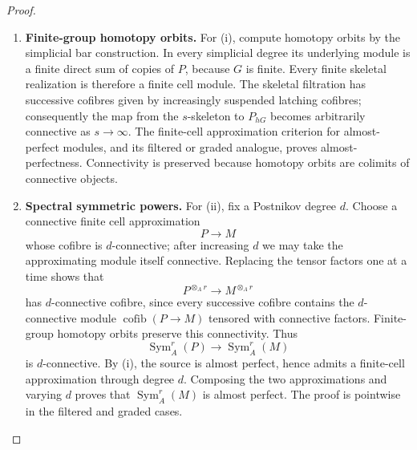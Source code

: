 \begin{proof}
\leavevmode
\begin{enumerate}[label=\textup{(\arabic*)}]
    \item \textbf{Finite-group homotopy orbits.}
    For \textup{(i)}, compute homotopy orbits by the simplicial bar construction.
    In every simplicial degree its underlying module is a finite direct sum of
    copies of \(P\), because \(G\) is finite. Every finite skeletal realization
    is therefore a finite cell module. The skeletal filtration has successive
    cofibres given by increasingly suspended latching cofibres; consequently the
    map from the \(s\)-skeleton to \(P_{hG}\) becomes arbitrarily connective as
    \(s\to\infty\). The finite-cell approximation criterion for almost-perfect
    modules, and its filtered or graded analogue, proves almost-perfectness.
    Connectivity is preserved because homotopy orbits are colimits of connective
    objects.
    \item \textbf{Spectral symmetric powers.}
    For \textup{(ii)}, fix a Postnikov degree \(d\). Choose a connective finite
    cell approximation
    \[
        P\longrightarrow M
    \]
    whose cofibre is \(d\)-connective; after increasing \(d\) we may take the
    approximating module itself connective. Replacing the tensor factors one at a
    time shows that
    \[
        P^{\otimes_A r}\longrightarrow M^{\otimes_A r}
    \]
    has \(d\)-connective cofibre, since every successive cofibre contains the
    \(d\)-connective module \(\operatorname{cofib}(P\to M)\) tensored with
    connective factors. Finite-group homotopy orbits preserve this connectivity.
    Thus
    \[
        \operatorname{Sym}^r_A(P)
        \longrightarrow
        \operatorname{Sym}^r_A(M)
    \]
    is \(d\)-connective. By \textup{(i)}, the source is almost perfect, hence
    admits a finite-cell approximation through degree \(d\). Composing the two
    approximations and varying \(d\) proves that
    \(\operatorname{Sym}^r_A(M)\) is almost perfect. The proof is pointwise in
    the filtered and graded cases.
\end{enumerate}
\end{proof}



